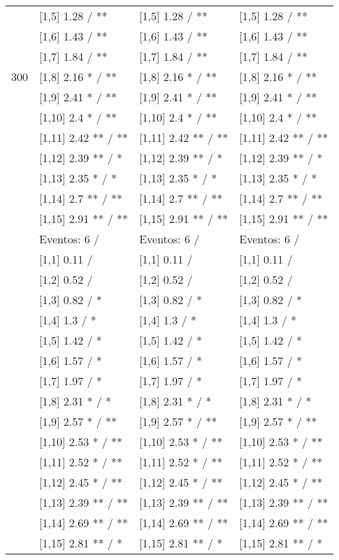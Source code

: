 \begin{table}
\begin{tabular}[t]{llll}
 & {}[1,5] 1.28  / ** & {}[1,5] 1.28  / ** & {}[1,5] 1.28  / **\\
 & {}[1,6] 1.43  / ** & {}[1,6] 1.43  / ** & {}[1,6] 1.43  / **\\
 & {}[1,7] 1.84  / ** & {}[1,7] 1.84  / ** & {}[1,7] 1.84  / **\\
300 & {}[1,8] 2.16 * / ** & {}[1,8] 2.16 * / ** & {}[1,8] 2.16 * / **\\
\addlinespace
 & {}[1,9] 2.41 * / ** & {}[1,9] 2.41 * / ** & {}[1,9] 2.41 * / **\\
 & {}[1,10] 2.4 * / ** & {}[1,10] 2.4 * / ** & {}[1,10] 2.4 * / **\\
 & {}[1,11] 2.42 ** / ** & {}[1,11] 2.42 ** / ** & {}[1,11] 2.42 ** / **\\
 & {}[1,12] 2.39 ** / * & {}[1,12] 2.39 ** / * & {}[1,12] 2.39 ** / *\\
 & {}[1,13] 2.35 * / * & {}[1,13] 2.35 * / * & {}[1,13] 2.35 * / *\\
\addlinespace
 & {}[1,14] 2.7 ** / ** & {}[1,14] 2.7 ** / ** & {}[1,14] 2.7 ** / **\\
 & {}[1,15] 2.91 ** / ** & {}[1,15] 2.91 ** / ** & {}[1,15] 2.91 ** / **\\
 & Eventos:  6 / & Eventos:  6 / & Eventos:  6 /\\
 & {}[1,1] 0.11  / & {}[1,1] 0.11  / & {}[1,1] 0.11  /\\
 & {}[1,2] 0.52  / & {}[1,2] 0.52  / & {}[1,2] 0.52  /\\
\addlinespace
 & {}[1,3] 0.82  / * & {}[1,3] 0.82  / * & {}[1,3] 0.82  / *\\
 & {}[1,4] 1.3  / * & {}[1,4] 1.3  / * & {}[1,4] 1.3  / *\\
 & {}[1,5] 1.42  / * & {}[1,5] 1.42  / * & {}[1,5] 1.42  / *\\
 & {}[1,6] 1.57  / * & {}[1,6] 1.57  / * & {}[1,6] 1.57  / *\\
 & {}[1,7] 1.97  / * & {}[1,7] 1.97  / * & {}[1,7] 1.97  / *\\
\addlinespace
500 & {}[1,8] 2.31 * / * & {}[1,8] 2.31 * / * & {}[1,8] 2.31 * / *\\
 & {}[1,9] 2.57 * / ** & {}[1,9] 2.57 * / ** & {}[1,9] 2.57 * / **\\
 & {}[1,10] 2.53 * / ** & {}[1,10] 2.53 * / ** & {}[1,10] 2.53 * / **\\
 & {}[1,11] 2.52 * / ** & {}[1,11] 2.52 * / ** & {}[1,11] 2.52 * / **\\
 & {}[1,12] 2.45 * / ** & {}[1,12] 2.45 * / ** & {}[1,12] 2.45 * / **\\
\addlinespace
 & {}[1,13] 2.39 ** / ** & {}[1,13] 2.39 ** / ** & {}[1,13] 2.39 ** / **\\
 & {}[1,14] 2.69 ** / ** & {}[1,14] 2.69 ** / ** & {}[1,14] 2.69 ** / **\\
 & {}[1,15] 2.81 ** / * & {}[1,15] 2.81 ** / * & {}[1,15] 2.81 ** / *\\
\bottomrule
\end{tabular}
\end{table}
